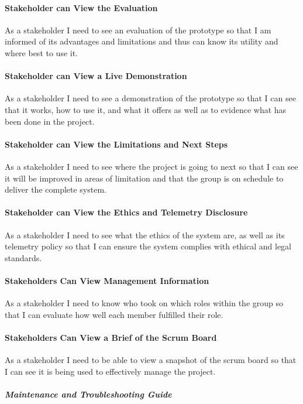 \paragraph{Stakeholder can View the Evaluation}
As a stakeholder I need to see an evaluation of the prototype so that I am informed of its advantages and limitations and thus can know its utility and where best to use it.

\paragraph{Stakeholder can View a Live Demonstration}
As a stakeholder I need to see a demonstration of the prototype so that I can see that it works, how to use it, and what it offers as well as to evidence what has been done in the project.

\paragraph{Stakeholder can View the Limitations and Next Steps}
As a stakeholder I need to see where the project is going to next so that I can see it will be improved in areas of limitation and that the group is on schedule to deliver the complete system.

\paragraph{Stakeholder can View the Ethics and Telemetry Disclosure}
As a stakeholder I need to see what the ethics of the system are, as well as its telemetry policy so that I can ensure the system complies with ethical and legal standards.

\paragraph{Stakeholders Can View Management Information}
As a stakeholder I need to know who took on which roles within the group so that I can evaluate how well each member fulfilled their role.

\paragraph{Stakeholders Can View a Brief of the Scrum Board}
As a stakeholder I need to be able to view a snapshot of the scrum board so that I can see it is being used to effectively manage the project.

\subparagraph{Maintenance and Troubleshooting Guide}

